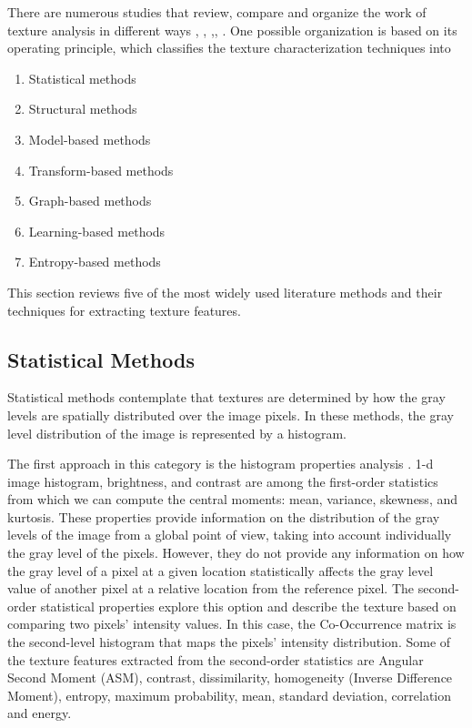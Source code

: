 There are numerous studies that review, compare and organize the work of texture analysis in different ways  \citep{Materka.Strzelecki:Report:1998}, \citep{Zhang.Tan:PR:2002}, \citep{Bharati.Liu.ea:CILS:2004},\citep{Lukashevich.Sadykhov:ICPCI:2012}, \citep{Humeau-Heurtier:IEEEAccess:2019}. One possible organization is based on its operating principle, which classifies the texture characterization techniques into
 \begin{enumerate}[noitemsep]%
	\item Statistical methods
	\item Structural methods
	\item Model-based methods
	\item Transform-based methods
	\item Graph-based methods
	\item Learning-based methods
	\item Entropy-based methods
\end{enumerate}
This section reviews five of the most widely used literature methods and their techniques for extracting texture features.

\subsection{Statistical Methods}
Statistical methods contemplate that textures are determined by how the gray levels are spatially distributed over the image pixels. In these methods, the gray level distribution of the image is represented by a histogram.

The first approach in this category is the histogram properties analysis \citep{Aggarwal.K.Agrawal:JSIP:2012}. 1-d image histogram, brightness, and contrast are among the first-order statistics from which we can compute the central moments: mean, variance, skewness, and kurtosis. These properties provide information on the distribution of the gray levels of the image from a global point of view, taking into account individually the gray level of the pixels. However, they do not provide any information on how the gray level of a pixel at a given location statistically affects the gray level value of another pixel at a relative location from the reference pixel. 
The second-order statistical properties explore this option and describe the texture based on comparing two pixels' intensity values. In this case, the Co-Occurrence matrix \citep{Haralick.Shanmugam.ea:TSMC:1973} is the second-level histogram that maps the pixels' intensity distribution. Some of the texture features extracted from the second-order statistics are Angular Second Moment (ASM), contrast, dissimilarity, homogeneity (Inverse Difference Moment), entropy, maximum probability, mean, standard deviation, correlation and energy.

